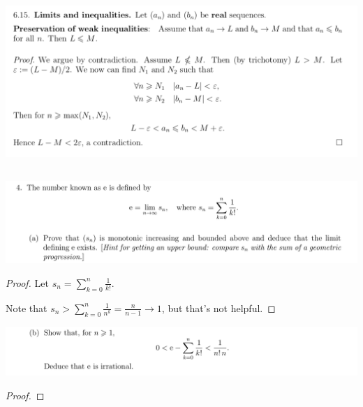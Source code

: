 \documentclass[12pt]{article}
\begin{document}
\begin{mdframed}
  \includegraphics[width=400pt]{img/analysis--oxford-M2-I-preservation-weak-inequalities.png}
\end{mdframed}



\newpage
\subsection{}
\begin{mdframed}
\includegraphics[width=400pt]{img/analysis--oxford-M2-I-5-4-a.png}
\end{mdframed}

\begin{proof}
  Let $s_n = \sum_{k=0}^n \frac{1}{k!}$.


  Note that $s_n > \sum_{k=0}^n \frac{1}{n^k} = \frac{n}{n-1} \to 1$, but that's not helpful.
\end{proof}

\begin{mdframed}
\includegraphics[width=400pt]{img/analysis--oxford-M2-I-5-4-b.png}
\end{mdframed}

\begin{proof}

\end{proof}
\end{document}
